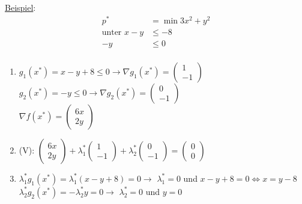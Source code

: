\underline{Beispiel}:
\begin{align*}
    p^* &= \min 3x^2 + y^2\\
    \text{unter } x - y &\leq -8\\
    -y &\leq 0\\
\end{align*}

\begin{enumerate}
    \item \(g_1(x^*)=x-y+8 \leq 0 \rightarrow \nabla g_1(x^*) = \begin{pmatrix}
        1\\-1
    \end{pmatrix}\)\\
    \(g_2(x^*)=-y \leq 0 \rightarrow \nabla g_2(x^*) = \begin{pmatrix}
        0\\-1
    \end{pmatrix}\)\\
    \(\nabla f(x^*) = \begin{pmatrix}
        6x\\2y
    \end{pmatrix}\)\\

    \item (V): \(\begin{pmatrix}
        6x\\2y
    \end{pmatrix} + \lambda_1^* \begin{pmatrix}
        1\\-1
    \end{pmatrix} + \lambda_2^* \begin{pmatrix}
        0\\-1
    \end{pmatrix} = \begin{pmatrix}
        0\\0
    \end{pmatrix}\)\\

    \item \(\lambda_1^* g_1(x^*) = \lambda_1^*(x-y+8)=0 \rightarrow\) \underline{\(\lambda_1^*=0\)} und \(x-y+8=0 \Leftrightarrow \)\underline{\(x = y-8\)}\\
          \(\lambda_2^* g_2(x^*) = -\lambda_2^* y = 0 \rightarrow\) \underline{\(\lambda_2^*=0\)} und \underline{\(y=0\)}\\
    

\end{enumerate}
